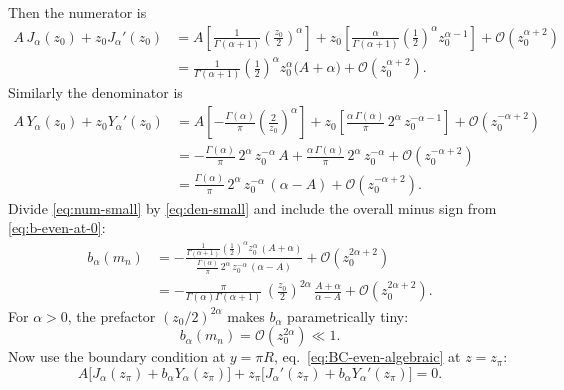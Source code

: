 \documentclass[11pt]{article}
\begin{document}
Then the numerator is
\begin{align}
A\,J_\alpha(z_0)+z_0 J_\alpha'(z_0)
&=
A\left[\frac{1}{\Gamma(\alpha+1)}\left(\frac{z_0}{2}\right)^\alpha\right]
+z_0\left[
\frac{\alpha}{\Gamma(\alpha+1)}\left(\frac{1}{2}\right)^\alpha z_0^{\alpha-1}
\right]
+\mathcal{O}(z_0^{\alpha+2})
\nonumber\\[4pt]
&=
\frac{1}{\Gamma(\alpha+1)}\left(\frac{1}{2}\right)^\alpha z_0^\alpha
\Big(A+\alpha\Big)
+\mathcal{O}(z_0^{\alpha+2}).
\label{eq:num-small}
\end{align}
Similarly the denominator is
\begin{align}
A\,Y_\alpha(z_0)+z_0 Y_\alpha'(z_0)
&=
A\left[-\frac{\Gamma(\alpha)}{\pi}\left(\frac{2}{z_0}\right)^\alpha\right]
+z_0\left[
\frac{\alpha\,\Gamma(\alpha)}{\pi}\,2^\alpha\,z_0^{-\alpha-1}
\right]
+\mathcal{O}(z_0^{-\alpha+2})
\nonumber\\[4pt]
&=
-\frac{\Gamma(\alpha)}{\pi}\,2^\alpha\,z_0^{-\alpha}\,A
+\frac{\alpha\,\Gamma(\alpha)}{\pi}\,2^\alpha\,z_0^{-\alpha}
+\mathcal{O}(z_0^{-\alpha+2})
\nonumber\\[4pt]
&=
\frac{\Gamma(\alpha)}{\pi}\,2^\alpha\,z_0^{-\alpha}\,(\alpha-A)
+\mathcal{O}(z_0^{-\alpha+2}).
\label{eq:den-small}
\end{align}
Divide \eqref{eq:num-small} by \eqref{eq:den-small} and include the overall minus sign from
\eqref{eq:b-even-at-0}:
\begin{align}
b_\alpha(m_n)
&=
-
\frac{\displaystyle \frac{1}{\Gamma(\alpha+1)}\left(\frac{1}{2}\right)^\alpha z_0^\alpha\,(A+\alpha)}
{\displaystyle \frac{\Gamma(\alpha)}{\pi}\,2^\alpha\,z_0^{-\alpha}\,(\alpha-A)}
+\mathcal{O}(z_0^{2\alpha+2})
\nonumber\\[6pt]
&=
-
\frac{\pi}{\Gamma(\alpha)\Gamma(\alpha+1)}\,
\left(\frac{z_0}{2}\right)^{2\alpha}\,
\frac{A+\alpha}{\alpha-A}
+\mathcal{O}(z_0^{2\alpha+2}).
\label{eq:b-even-small}
\end{align}
For $\alpha>0$, the prefactor $(z_0/2)^{2\alpha}$ makes $b_\alpha$ parametrically tiny:
\begin{equation}
b_\alpha(m_n)=\mathcal{O}(z_0^{2\alpha})\ll 1.
\label{eq:b-small-even}
\end{equation}
Now use the boundary condition at $y=\pi R$, eq.~\eqref{eq:BC-even-algebraic} at $z=z_\pi$:
\begin{equation}
A\Big[J_\alpha(z_\pi)+b_\alpha Y_\alpha(z_\pi)\Big]
+z_\pi\Big[J_\alpha'(z_\pi)+b_\alpha Y_\alpha'(z_\pi)\Big]=0.
\label{eq:BC-even-pi}
\end{equation}
\end{document}
